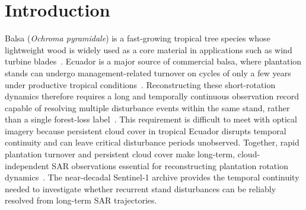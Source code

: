 
\section{Introduction}
\label{sec:introduction}

Balsa (\textit{Ochroma pyramidale}) is a fast-growing tropical tree species whose lightweight wood is widely used as a core material in applications such as wind turbine blades~\citep{Midgley2010Balsa,Jenkin2019BalsaValueChain,Borrega2015Balsa_mechanics}. Ecuador is a major source of commercial balsa, where plantation stands can undergo management-related turnover on cycles of only a few years under productive tropical conditions~\citep{GonzalezOsorio2010Balsa,CanadasLopez2019BalsaGrowth}. Reconstructing these short-rotation dynamics therefore requires a long and temporally continuous observation record capable of resolving multiple disturbance events within the same stand, rather than a single forest-loss label~\citep{CanadasLopez2019BalsaGrowth,Jenkin2019BalsaValueChain}. This requirement is difficult to meet with optical imagery because persistent cloud cover in tropical Ecuador disrupts temporal continuity and can leave critical disturbance periods unobserved. Together, rapid plantation turnover and persistent cloud cover make long-term, cloud-independent SAR observations essential for reconstructing plantation rotation dynamics~\citep{Reiche2018Bayesian,Doblas2020harmonic,Matthew2021BFAST,Bullock2022CCDC_S1,FLORES2026Sensitivity}. The near-decadal Sentinel-1 archive provides the temporal continuity~\citep{Torres2012S1} needed to investigate whether recurrent stand disturbances can be reliably resolved from long-term SAR trajectories.


